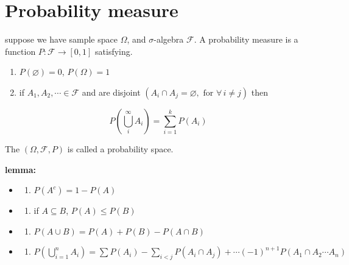 \documentclass[
  letterpaper,
  DIV=11,
  numbers=noendperiod]{scrreprt}
\providecommand{\tightlist}{%
  \setlength{\itemsep}{0pt}\setlength{\parskip}{0pt}}
\theoremstyle{definition}
\theoremstyle{plain}
\theoremstyle{plain}
\theoremstyle{definition}
\theoremstyle{plain}
\theoremstyle{plain}
\theoremstyle{remark}
\begin{document}
\section{Probability measure}\label{probability-measure}

suppose we have sample space \(\Omega\), and \(\sigma\)-algebra
\(\mathcal{F}\). A probability measure is a function
\(P : \mathcal{F} \to [0, 1]\) satisfying.

\begin{enumerate}
\def\labelenumi{\arabic{enumi}.}
\tightlist
\item
  \(P(\varnothing) = 0\), \(P(\Omega) = 1\)
\item
  if \(A_1, A_2, \cdots \in \mathcal{F}\) and are disjoint
  \((A_i \cap A_j = \varnothing, \text{ for } \forall\, i \neq j)\) then
\end{enumerate}

\[
P\!\left(\bigcup_i^\infty A_i\right) = \sum_{i=1}^{k} P(A_i)
\]

The \((\Omega, \mathcal{F}, P)\) is called a probability space.

\textbf{lemma:}

\begin{itemize}
\tightlist
\item
  \begin{enumerate}
  \def\labelenumi{(\alph{enumi})}
  \tightlist
  \item
    \(P(A^c) = 1 - P(A)\)
  \end{enumerate}
\item
  \begin{enumerate}
  \def\labelenumi{(\alph{enumi})}
  \setcounter{enumi}{1}
  \tightlist
  \item
    if \(A \subseteq B\), \(P(A) \leq P(B)\)
  \end{enumerate}
\item
  \begin{enumerate}
  \def\labelenumi{(\alph{enumi})}
  \setcounter{enumi}{2}
  \tightlist
  \item
    \(P(A \cup B) = P(A) + P(B) - P(A \cap B)\)
  \end{enumerate}
\item
  \begin{enumerate}
  \def\labelenumi{(\alph{enumi})}
  \setcounter{enumi}{3}
  \tightlist
  \item
    \(P\!\left(\bigcup_{i=1}^n A_i\right) = \sum P(A_i) - \sum_{i<j} P(A_i \cap A_j) + \cdots (-1)^{n+1} P(A_1 \cap A_2 \cdots A_n)\)
  \end{enumerate}
\end{itemize}
\end{document}
